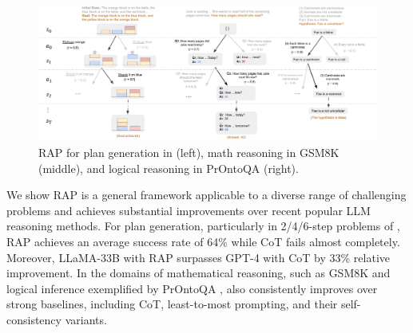 \begin{figure}[!t]
    \centering
    \includegraphics[width=\textwidth]{sections/Figure-2_final.pdf}
    \vspace{-22pt}
    \caption{RAP for plan generation in \blocksworld (left), math reasoning in GSM8K (middle), and logical reasoning in PrOntoQA (right).}
    \label{fig:tree_examples}
    \vspace{-15pt}
\end{figure}

We show RAP is a general framework applicable to a diverse range of challenging problems and achieves substantial improvements over recent popular LLM reasoning methods.
For plan generation, particularly in 2/4/6-step problems of \blocksworld \cite{valmeekam2023planning}, RAP achieves an average success rate of 64\% while CoT fails almost completely. Moreover, LLaMA-33B with RAP surpasses GPT-4 with CoT by 33\% relative improvement.
In the domains of mathematical reasoning, such as GSM8K \cite{cobbe2021training} and logical inference exemplified by PrOntoQA \cite{saparov2022language}, \ours also consistently improves over strong baselines, including CoT, least-to-most prompting, and their self-consistency variants.
 




